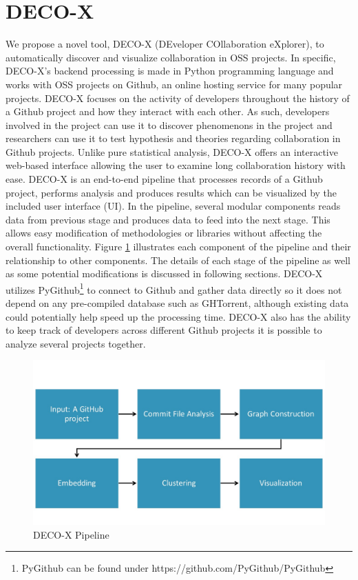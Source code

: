 \documentclass{article}
\begin{document}
\section{DECO-X}
We propose a novel tool, DECO-X (DEveloper COllaboration eXplorer), to automatically discover and visualize collaboration in OSS projects. In specific, DECO-X's backend processing is made in Python programming language and works with OSS projects on Github, an online hosting service for many popular projects. DECO-X focuses on the activity of developers throughout the history of a Github project and how they interact with each other. As such, developers involved in the project can use it to discover phenomenons in the project and researchers can use it to test hypothesis and theories regarding collaboration in Github projects. Unlike pure statistical analysis, DECO-X offers an interactive web-based interface allowing the user to examine long collaboration history with ease. DECO-X is an end-to-end pipeline that processes records of a Github project, performs analysis and produces results which can be visualized by the included user interface (UI). In the pipeline, several modular components reads data from previous stage and produces data to feed into the next stage. This allows easy modification of methodologies or libraries without affecting the overall functionality. Figure \ref{fig:pipeline} illustrates each component of the pipeline and their relationship to other components. The details of each stage of the pipeline as well as some potential modifications is discussed in following sections. DECO-X utilizes PyGithub\footnote{PyGithub can be found under https://github.com/PyGithub/PyGithub} to connect to Github and gather data directly so it does not depend on any pre-compiled database such as GHTorrent\citep{Gousi13}, although existing data could potentially help speed up the processing time. DECO-X also has the ability to keep track of developers across different Github projects it is possible to analyze several projects together.
\begin{figure}[h!]
\centering
\includegraphics[scale=0.3]{images/pipeline.jpg}
\caption{DECO-X Pipeline}
\label{fig:pipeline}
\end{figure}
\end{document}
